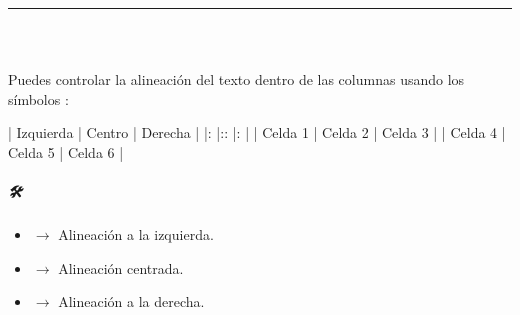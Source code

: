 \documentclass[a4paper,10pt,oneside,spanish,openany]{sphinxmanual}
\begin{document}
\bigskip\hrule\bigskip



\subsubsection{}
\label{\detokenize{configuracion_inicial/013.guia_de_myst_parser:tablas-con-alineacion}}

\paragraph{📌 }
\label{\detokenize{configuracion_inicial/013.guia_de_myst_parser:alinear-el-contenido-de-las-columnas}}
\sphinxAtStartPar
Puedes controlar la alineación del texto dentro de las columnas usando los símbolos \sphinxcode{\sphinxupquote{:}}:

\begin{sphinxVerbatim}[commandchars=\\\{\}]
| Izquierda   | Centro     | Derecha   |
|:\PYGZhy{}\PYGZhy{}\PYGZhy{}\PYGZhy{}\PYGZhy{}\PYGZhy{}\PYGZhy{}\PYGZhy{}\PYGZhy{}\PYGZhy{}\PYGZhy{} |:\PYGZhy{}\PYGZhy{}\PYGZhy{}\PYGZhy{}\PYGZhy{}\PYGZhy{}\PYGZhy{}\PYGZhy{}\PYGZhy{}: |\PYGZhy{}\PYGZhy{}\PYGZhy{}\PYGZhy{}\PYGZhy{}\PYGZhy{}\PYGZhy{}\PYGZhy{}\PYGZhy{}: |
| Celda 1     | Celda 2    | Celda 3   |
| Celda 4     | Celda 5    | Celda 6   |
\end{sphinxVerbatim}


\subparagraph{🛠️ }
\label{\detokenize{configuracion_inicial/013.guia_de_myst_parser:id2}}\begin{itemize}
\item {} 
\sphinxAtStartPar
\sphinxcode{\sphinxupquote{:\sphinxhyphen{}\sphinxhyphen{}\sphinxhyphen{}}} \(\rightarrow\) Alineación a la izquierda.

\item {} 
\sphinxAtStartPar
\sphinxcode{\sphinxupquote{:\sphinxhyphen{}\sphinxhyphen{}\sphinxhyphen{}:}} \(\rightarrow\) Alineación centrada.

\item {} 
\sphinxAtStartPar
\sphinxcode{\sphinxupquote{\sphinxhyphen{}\sphinxhyphen{}\sphinxhyphen{}:}} \(\rightarrow\) Alineación a la derecha.

\end{itemize}

\sphinxAtStartPar
{}
\end{document}
